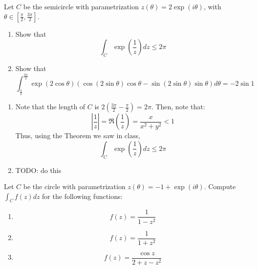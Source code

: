\documentclass{article}
\renewcommand{\exp}[1]{\operatorname{exp}\left(#1\right)}
\begin{document}
    \begin{tcolorbox}[title=Exercise 6]
        Let $C$ be the semicircle with parametrization $z(\theta) = 2\exp{i\theta}$, with $\theta \in [\frac{\pi}{2}, \frac{3\pi}{2}]$.
        \begin{enumerate}[label=(\alph*)]
            \item Show that
            \begin{equation*}
                \int_C{\exp{\frac{1}{z}}}dz \leq 2\pi
            \end{equation*}
            \item Show that
            \begin{equation*}
                \int_{\frac{\pi}{2}}^{\frac{3\pi}{2}} \exp{2\cos{\theta}}(\cos(2\sin{\theta})\cos{\theta} - \sin(2\sin{\theta})\sin{\theta}) d\theta = -2\sin{1}
            \end{equation*}
        \end{enumerate}
    \end{tcolorbox}
    \begin{enumerate}[label=(\alph*)]
        \item Note that the length of $C$ is $2\left(\frac{3\pi}{2} - \frac{\pi}{2}\right) = 2\pi$. Then, note that:
        \begin{equation*}
            \left|\frac{1}{z}\right| = \Re\left(\frac{1}{z}\right) = \frac{x}{x^2 + y^2} < 1
        \end{equation*}
        Thus, using the Theorem we saw in class, 
        \begin{equation*}
            \int_C{\exp{\frac{1}{z}}}dz \leq 2\pi
        \end{equation*}
        \item TODO: do this
    \end{enumerate}

    \begin{tcolorbox}[title=Exercise 7]
        Let $C$ be the circle with parametrization $z(\theta) = -1 + \exp{i\theta}$. Compute $\int_C{f(z)dz}$ for the following functions:
        \begin{enumerate}[label=(\alph*)]
            \item \begin{equation*}
                f(z) = \frac{1}{1 - z^2}
            \end{equation*}
            \item \begin{equation*}
                f(z) = \frac{1}{1 + z^2}
            \end{equation*}
            \item \begin{equation*}
                f(z) = \frac{\cos{z}}{2 + z - z^2}
            \end{equation*}
        \end{enumerate}
    \end{tcolorbox}
\end{document}
